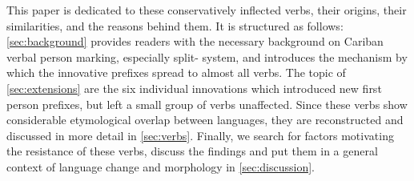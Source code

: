 This paper is dedicated to these conservatively inflected verbs, their origins, their similarities, and the reasons behind them.
It is structured as follows: \cref{sec:background} provides readers with the necessary background on Cariban verbal person marking, especially split- system, and introduces the mechanism by which the innovative prefixes spread to almost all  verbs.
The topic of \cref{sec:extensions} are the six individual innovations which introduced new first person prefixes, but left a small group of verbs unaffected.
Since these verbs show considerable etymological overlap between languages, they are reconstructed and discussed in more detail in \cref{sec:verbs}.
Finally, we search for factors motivating the resistance of these verbs, discuss the findings and put them in a general context of language change and morphology in \cref{sec:discussion}.